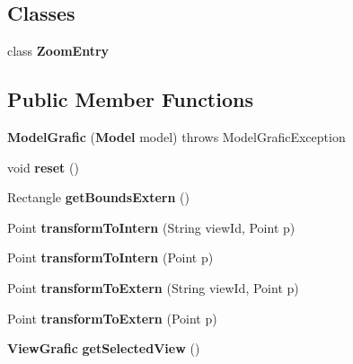 \subsection*{Classes}
\begin{DoxyCompactItemize}
\item 
class {\bf Zoom\-Entry}
\end{DoxyCompactItemize}
\subsection*{Public Member Functions}
\begin{DoxyCompactItemize}
\item 
{\bfseries Model\-Grafic} ({\bf Model} model)  throws Model\-Grafic\-Exception\label{classdesmoj_1_1extensions_1_1visualization2d_1_1engine_1_1model_grafic_1_1_model_grafic_ae4fe1ac059d706b26bcdab1b5d5cfe5c}

\item 
void {\bfseries reset} ()\label{classdesmoj_1_1extensions_1_1visualization2d_1_1engine_1_1model_grafic_1_1_model_grafic_a05bb47bb7b3f75a06782c511c254bb4a}

\item 
Rectangle {\bf get\-Bounds\-Extern} ()
\item 
Point {\bfseries transform\-To\-Intern} (String view\-Id, Point p)\label{classdesmoj_1_1extensions_1_1visualization2d_1_1engine_1_1model_grafic_1_1_model_grafic_a962aece9d532da093adb9622f7b37699}

\item 
Point {\bfseries transform\-To\-Intern} (Point p)\label{classdesmoj_1_1extensions_1_1visualization2d_1_1engine_1_1model_grafic_1_1_model_grafic_a144c1c9de55cf14b0346107c255dfa06}

\item 
Point {\bfseries transform\-To\-Extern} (String view\-Id, Point p)\label{classdesmoj_1_1extensions_1_1visualization2d_1_1engine_1_1model_grafic_1_1_model_grafic_ae66ebc56cc9e336645efe8b1c6eadb4a}

\item 
Point {\bfseries transform\-To\-Extern} (Point p)\label{classdesmoj_1_1extensions_1_1visualization2d_1_1engine_1_1model_grafic_1_1_model_grafic_aa1eebfe89d0a666b0f1ae16a3d86b113}

\item 
{\bf View\-Grafic} {\bfseries get\-Selected\-View} ()\label{classdesmoj_1_1extensions_1_1visualization2d_1_1engine_1_1model_grafic_1_1_model_grafic_a188e000fdbbec71b7b1a1d2aeebbecc8}


\end{DoxyCompactItemize}
